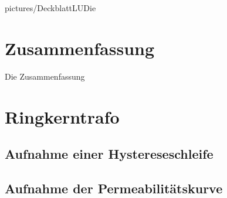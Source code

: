 \documentclass[a4paper,twoside,12pt,DIV=13,BCOR=5mm,numbers=noenddot,cleardoublepage=empty]{scrbook}
\begin{document}
\newcommand\todo[1]{\textcolor{red}{#1}}
\renewcommand{\baselinestretch}{1.25}
\newcommand{\StudentA}{Marton Harsch}
\newcommand{\MatrNrA}{12123680}
\newcommand{\StudentB}{Michael Malburg}
\newcommand{\MatrNrB}{61806515}
\newcommand{\StudentC}{Jonathan Gamperl}
\newcommand{\MatrNrC}{12302766}

\newcommand{\LUDatum}{22.4.2024}
\newcommand{\LUGruppe}{}
\newcommand{\LUBetreuer}{}

\large

{pictures/DeckblattLUDie}     %



\cleardoublepage
\setcounter{tocdepth}{3}

\setcounter{page}{0}
\renewcommand{\thepage}{\roman{page}}
\tableofcontents \cleardoublepage

\setcounter{page}{1}
\renewcommand{\thepage}{\arabic{page}}
\setcounter{chapter}{0}



\newpage
\chapter{Zusammenfassung}
Die Zusammenfassung
\newpage
\chapter{Ringkerntrafo}
\section{Aufnahme einer Hystereseschleife}

\section{Aufnahme der Permeabilitätskurve}
\end{document}
